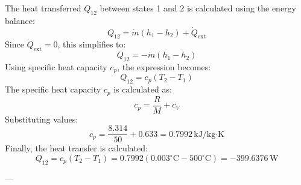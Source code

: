 The heat transferred \( Q_{12} \) between states 1 and 2 is calculated using the energy balance:  
\[
Q_{12} = \dot{m} (h_1 - h_2) + \dot{Q}_{\text{ext}}
\]  
Since \( \dot{Q}_{\text{ext}} = 0 \), this simplifies to:  
\[
Q_{12} = -\dot{m} (h_1 - h_2)
\]  
Using specific heat capacity \( c_p \), the expression becomes:  
\[
Q_{12} = c_p (T_2 - T_1)
\]  
The specific heat capacity \( c_p \) is calculated as:  
\[
c_p = \frac{R}{M} + c_V
\]  
Substituting values:  
\[
c_p = \frac{8.314}{50} + 0.633 = 0.7992 \, \text{kJ/kg·K}
\]  
Finally, the heat transfer is calculated:  
\[
Q_{12} = c_p (T_2 - T_1) = 0.7992 (0.003^\circ\text{C} - 500^\circ\text{C}) = -399.6376 \, \text{W}
\]

---